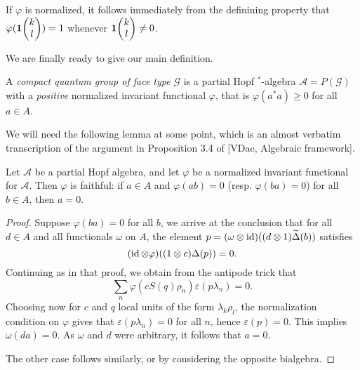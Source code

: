 \begin{Rem} If $\varphi$ is normalized, it follows immediately from the definining property that $\varphi(\mathbf{1}\!\begin{pmatrix} k \\ l\end{pmatrix})=1$ whenever $\mathbf{1}\!\begin{pmatrix} k \\ l\end{pmatrix}\neq 0$.
\end{Rem} 

We are finally ready to give our main definition.

\begin{Def} A \emph{compact quantum group of face type} $\mathscr{G}$ is a partial Hopf $^*$-algebra $\mathscr{A} = P(\mathscr{G})$ with a \emph{positive} normalized invariant functional $\varphi$, that is $\varphi(a^*a)\geq 0$ for all $a\in A$. 
\end{Def} 

We will need the following lemma at some point, which is an almost verbatim transcription of the argument in  Proposition 3.4 of [VDae, Algebraic framework].

\begin{Lem} Let $\mathscr{A}$ be a partial Hopf algebra, and let $\varphi$ be a normalized invariant functional for $\mathscr{A}$. Then $\varphi$ is faithful: if $a\in A$ and $\varphi(ab) =0$ (resp. $\varphi(ba)=0$) for all $b\in A$, then $a=0$.
\end{Lem} 
\begin{proof} Suppose  $\varphi(ba)=0$ for all $b$, we arrive at the conclusion that for all $d\in A$ and all functionals $\omega$ on $A$, the element $p = (\omega\otimes \operatorname{id})((d\otimes 1)\widetilde{\Delta}(b))$ satisfies \[(\operatorname{id}\otimes \varphi)((1\otimes c)\Delta(p)) = 0.\] Continuing as in that proof, we obtain from the antipode trick that \[\sum_n \varphi(cS(q)\rho_n)\varepsilon(p\lambda_n)=0.\] Choosing now for $c$ and $q$ local units of the form $\lambda_k\rho_l$, the normalization condition on $\varphi$ gives that $\varepsilon(p\lambda_n)=0$ for all $n$, hence $\varepsilon(p)=0$. This implies $\omega(da)=0$. As $\omega$ and $d$ were arbitrary, it follows that $a=0$.

The other case follows similarly, or by considering the opposite bialgebra.
\end{proof} 




